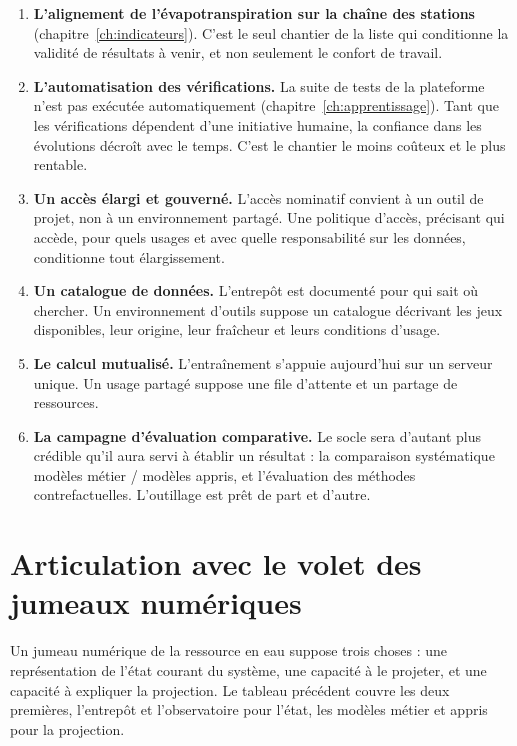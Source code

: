\begin{enumerate}
  \item \textbf{L'alignement de l'évapotranspiration sur la chaîne des stations}
  (chapitre~\ref{ch:indicateurs}). C'est le seul chantier de la liste qui conditionne la
  validité de résultats à venir, et non seulement le confort de travail.

  \item \textbf{L'automatisation des vérifications.} La suite de tests de la plateforme n'est pas
  exécutée automatiquement (chapitre~\ref{ch:apprentissage}). Tant que les vérifications
  dépendent d'une initiative humaine, la confiance dans les évolutions décroît avec le temps.
  C'est le chantier le moins coûteux et le plus rentable.

  \item \textbf{Un accès élargi et gouverné.} L'accès nominatif convient à un outil de projet, non
  à un environnement partagé. Une politique d'accès, précisant qui accède, pour quels usages et avec quelle
  responsabilité sur les données, conditionne tout élargissement.

  \item \textbf{Un catalogue de données.} L'entrepôt est documenté pour qui sait où chercher.
  Un environnement d'outils suppose un catalogue décrivant les jeux disponibles, leur origine,
  leur fraîcheur et leurs conditions d'usage.

  \item \textbf{Le calcul mutualisé.} L'entraînement s'appuie aujourd'hui sur un serveur unique.
  Un usage partagé suppose une file d'attente et un partage de ressources.

  \item \textbf{La campagne d'évaluation comparative.} Le socle sera d'autant plus crédible qu'il
  aura servi à établir un résultat : la comparaison systématique modèles métier / modèles appris,
  et l'évaluation des méthodes contrefactuelles. L'outillage est prêt de part et d'autre.
\end{enumerate}

\section{Articulation avec le volet des jumeaux numériques}

Un jumeau numérique de la ressource en eau suppose trois choses : une représentation de l'état
courant du système, une capacité à le projeter, et une capacité à expliquer la projection. Le
tableau précédent couvre les deux premières, l'entrepôt et l'observatoire pour l'état, les
modèles métier et appris pour la projection.

